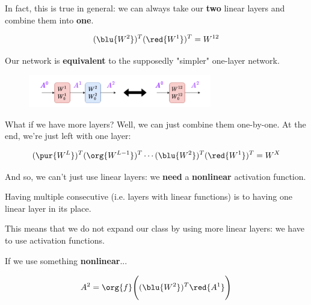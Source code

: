         In fact, this is true in general: we can always take our \textbf{two} linear layers and combine them into \textbf{one}.
        
        \begin{equation}
            (\blu{W^2})^T (\red{W^1})^T
            = W^{12}
        \end{equation}
        
        Our network is \textbf{equivalent} to the supposedly "simpler" one-layer network.
    
        \begin{figure}[H]
            \centering
            \includegraphics[width=80mm,scale=0.4]{images/nn_images/equivalent_networks.png}
        \end{figure}
        
        What if we have more layers? Well, we can just combine them one-by-one. At the end, we're just left with one layer:
        
        \begin{equation}
            (\pur{W^L})^T (\org{ {W^{L-1}} })^T \cdots (\blu{W^2})^T (\red{W^1})^T
            = W^{X}
        \end{equation}
        
        And so, we can't just use linear layers: we \textbf{need} a \textbf{nonlinear} activation function.\\
        
        \begin{concept}
            Having multiple consecutive  (i.e. layers with linear  functions) is  to having one linear layer in its place.
            
            This means that we do not expand our  class by using more linear layers: we have to use  activation functions.
        \end{concept}
        
        If we use something \textbf{nonlinear}...
        
        \begin{equation}
            A^2 = 
            \org{f}
            \Bigg( 
                (\blu{W^2})^T 
                \red{A^1}
            \Bigg)
        \end{equation}
        
